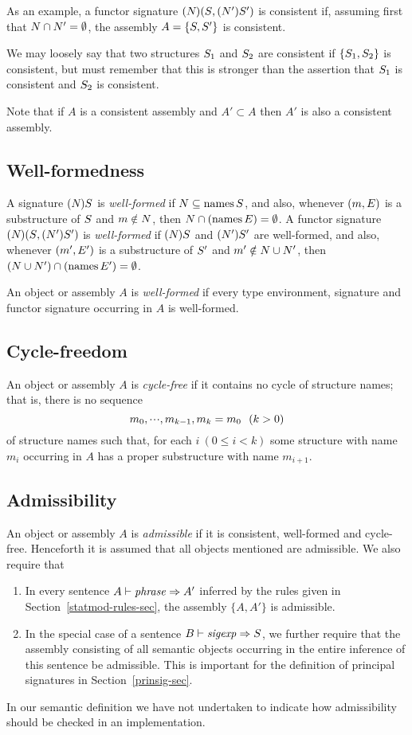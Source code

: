 As an example, a functor signature $\longfunsig{}$ is
consistent if, assuming first that $\N\cap\N'=\emptyset$,
the assembly $A=\{\S,\S'\}$ is consistent.

We may loosely say that two structures $\S_1$ and $\S_2$ are consistent if
$\{\S_1,\S_2\}$ is consistent, but must remember that this is stronger than
the assertion that $\S_1$ is consistent and $\S_2$ is consistent.

Note that if $A$ is a consistent assembly and $A'\subset A$ then $A'$ is
also a consistent assembly.

\subsection{Well-formedness}
A signature $\longsig{}$ is {\sl well-formed} 
if $\N\subseteq\NamesFcn\S$,
and also, whenever $(\m,\E)$ is a
substructure of $\S$ and $\m\notin\N$, then $\N\cap(\NamesFcn\E)=\emptyset$.
A functor signature $\longfunsig{}$ is {\sl well-formed} if
$\longsig{}$ and  $(\N')\S'$ are well-formed, and also, whenever
$(\m',\E')$ is a substructure of $\S'$ and $\m'\notin\N\cup\N'$,
then $(\N\cup\N')\cap(\NamesFcn\E')=\emptyset$.

An object or assembly $A$ is {\sl well-formed} if every type environment,
signature and functor signature occurring in $A$ is well-formed.

\subsection{Cycle-freedom}
An object or assembly $A$ is {\sl cycle-free} if it contains no
cycle of structure names; that is, there is no sequence
\[\m_0,\cdots,\m_{k-1},\m_k=m_0\ \ (k>0)\]
of structure names such that, for each $i\ (0\leq i<k)$ some structure
with name $m_i$ occurring in $A$ has a proper substructure with name
$m_{i+1}$.

\subsection{Admissibility}
\label{admis-sec}
An object or assembly $A$ is {\sl admissible} if it is
consistent, well-formed and cycle-free.  Henceforth it is assumed that
all objects mentioned are admissible.  We also require that
\begin{enumerate}
\item In every sentence $A\ts\phrase\ra A'$  inferred by the rules
given in Section~\ref{statmod-rules-sec}, the assembly $\{A,A'\}$ is
admissible.  
\item In the special case of a sentence $\B\ts\sigexp\ra\S$,
we further require that the assembly consisting of all semantic
objects occurring in the entire inference of this sentence be
admissible. This  is important for the definition of principal
signatures in Section~\ref{prinsig-sec}.
\end{enumerate}
In our semantic definition we have not undertaken to
indicate how admissibility should be checked in an implementation.
 
